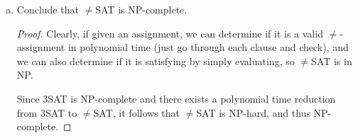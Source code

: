\documentclass{article}
\begin{document}
\begin{enumerate}
\begin{enumerate}[(a)]
\begin{proof}
					Otherwise, one of $y_1, y_2$ is not 0, so we can take $z_i=0,$ so we can construct the two clauses $(y_1\vee y_2\vee 0)$ and $(1\vee y_3\vee 0),$ which are both valid $\neq$-assignments. This is clearly polynomial time since we have only doubled the number of clauses, so if there exists a satisfying assignment to the original 3SAT, there exists a satisfying $\neq$-assignment.

					$(\impliedby):$ Consider a satisfying $\neq$-assignment to clauses $i$ being $(y_1\vee y_2\vee z_i)$ and $(\bar z_i\vee y_3\vee b).$ If one of $y_1, y_2,$ or $y_3$ is not 0, then the clause $(y_1\vee y_2\vee y_3)$ would be satisfied. Otherwise, if they are all 0, then by part (a), negating this $\neq$-assignment will still be satisfying, which means one of $\bar y_1, \bar y_2,$ or $\bar y_3$ would not be 0, and thus $(\bar y_1\vee \bar y_2\vee\bar y_3)$ is a satisfying assignment for 3SAT. Clearly this is polynomial time, so if there exists a satisfying assignment to the $\neq$SAT, there exists a satisfying assignment for SAT.
				\end{proof}

			\item Conclude that $\neq$SAT is NP-complete.
				\begin{proof}
					Clearly, if given an assignment, we can determine if it is a valid $\neq$-assignment in polynomial time (just go through each clause and check), and we can also determine if it is satisfying by simply evaluating, so $\neq$SAT is in NP.

					Since 3SAT is NP-complete and there exists a polynomial time reduction from 3SAT to $\neq$SAT, it follows that $\neq$SAT is NP-hard, and thus NP-complete.
				\end{proof}

		\end{enumerate}

\end{enumerate}
\end{document}
